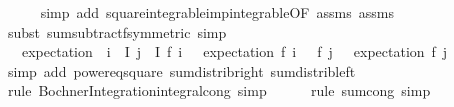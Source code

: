 \begin{isabellebody}
\ \ \ \ \isamarkupfalse%
\ {\isacharparenleft}{\kern0pt}simp\ add{\isacharcolon}{\kern0pt}\ square{\isacharunderscore}{\kern0pt}integrable{\isacharunderscore}{\kern0pt}imp{\isacharunderscore}{\kern0pt}integrable{\isacharbrackleft}{\kern0pt}OF\ assms{\isacharparenleft}{\kern0pt}{}{\isacharparenright}{\kern0pt}\ assms{\isacharparenleft}{\kern0pt}{}{\isacharparenright}{\kern0pt}{\isacharbrackright}{\kern0pt}{\isacharparenright}{\kern0pt}\isanewline
\ \ \ \ \isamarkupfalse%
\ {\isacharparenleft}{\kern0pt}subst\ sum{\isacharunderscore}{\kern0pt}subtractf{\isacharbrackleft}{\kern0pt}symmetric{\isacharbrackright}{\kern0pt}{\isacharcomma}{\kern0pt}\ simp{\isacharparenright}{\kern0pt}\isanewline
\ \ \isamarkupfalse%
\ \isamarkupfalse%
\ {\isachardoublequoteopen}{\isachardot}{\kern0pt}{\isachardot}{\kern0pt}{\isachardot}{\kern0pt}\ {\isacharequal}{\kern0pt}\ expectation\ {\isacharparenleft}{\kern0pt}{\isasymlambda}{\isasymomega}{\isachardot}{\kern0pt}\ {\isacharparenleft}{\kern0pt}{\isasymSum}i\ {\isasymin}\ I{\isachardot}{\kern0pt}\ {\isacharparenleft}{\kern0pt}{\isasymSum}j\ {\isasymin}\ I{\isachardot}{\kern0pt}\ {\isacharparenleft}{\kern0pt}f\ i\ {\isasymomega}\ {\isacharminus}{\kern0pt}\ expectation\ {\isacharparenleft}{\kern0pt}f\ i{\isacharparenright}{\kern0pt}{\isacharparenright}{\kern0pt}\ {\isacharasterisk}{\kern0pt}\ \ {\isacharparenleft}{\kern0pt}f\ j\ {\isasymomega}\ {\isacharminus}{\kern0pt}\ expectation\ {\isacharparenleft}{\kern0pt}f\ j{\isacharparenright}{\kern0pt}{\isacharparenright}{\kern0pt}{\isacharparenright}{\kern0pt}{\isacharparenright}{\kern0pt}{\isacharparenright}{\kern0pt}{\isachardoublequoteclose}\isanewline
\ \ \ \ \isamarkupfalse%
\ {\isacharparenleft}{\kern0pt}simp\ add{\isacharcolon}{\kern0pt}\ power{}{\isacharunderscore}{\kern0pt}eq{\isacharunderscore}{\kern0pt}square\ sum{\isacharunderscore}{\kern0pt}distrib{\isacharunderscore}{\kern0pt}right\ sum{\isacharunderscore}{\kern0pt}distrib{\isacharunderscore}{\kern0pt}left{\isacharparenright}{\kern0pt}\isanewline
\ \ \ \ \isamarkupfalse%
\ {\isacharparenleft}{\kern0pt}rule\ Bochner{\isacharunderscore}{\kern0pt}Integration{\isachardot}{\kern0pt}integral{\isacharunderscore}{\kern0pt}cong{\isacharcomma}{\kern0pt}\ simp{\isacharparenright}{\kern0pt}\isanewline
\ \ \ \ \isamarkupfalse%
\ {\isacharparenleft}{\kern0pt}rule\ sum{\isachardot}{\kern0pt}cong{\isacharcomma}{\kern0pt}\ simp{\isacharparenright}{\kern0pt}{\isacharplus}{\kern0pt}\isanewline

\end{isabellebody}
